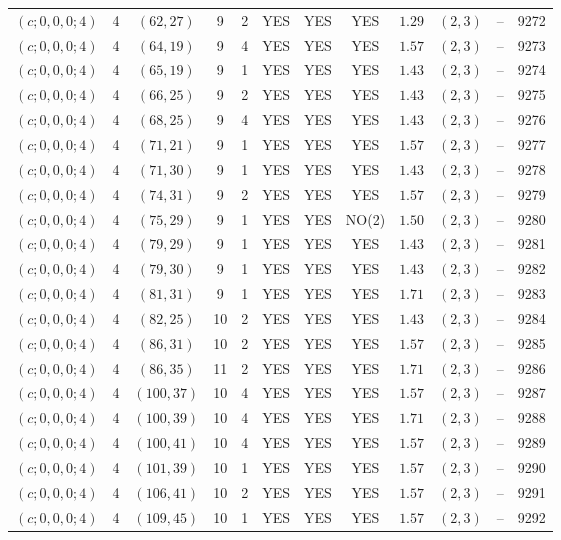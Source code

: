 \begin{longtable}{|c|c|c|c|c|c|c|c|c|c|c|c|}
$(c;0,0,0;4)$ & 4 & $(62,27)$ & 9 & 2 & YES & YES & YES & $1.29$ & $(2,3)$ & -- & 9272\\
$(c;0,0,0;4)$ & 4 & $(64,19)$ & 9 & 4 & YES & YES & YES & $1.57$ & $(2,3)$ & -- & 9273\\
$(c;0,0,0;4)$ & 4 & $(65,19)$ & 9 & 1 & YES & YES & YES & $1.43$ & $(2,3)$ & -- & 9274\\
$(c;0,0,0;4)$ & 4 & $(66,25)$ & 9 & 2 & YES & YES & YES & $1.43$ & $(2,3)$ & -- & 9275\\
$(c;0,0,0;4)$ & 4 & $(68,25)$ & 9 & 4 & YES & YES & YES & $1.43$ & $(2,3)$ & -- & 9276\\
$(c;0,0,0;4)$ & 4 & $(71,21)$ & 9 & 1 & YES & YES & YES & $1.57$ & $(2,3)$ & -- & 9277\\
$(c;0,0,0;4)$ & 4 & $(71,30)$ & 9 & 1 & YES & YES & YES & $1.43$ & $(2,3)$ & -- & 9278\\
$(c;0,0,0;4)$ & 4 & $(74,31)$ & 9 & 2 & YES & YES & YES & $1.57$ & $(2,3)$ & -- & 9279\\
$(c;0,0,0;4)$ & 4 & $(75,29)$ & 9 & 1 & YES & YES & NO(2) & $1.50$ & $(2,3)$ & -- & 9280\\
$(c;0,0,0;4)$ & 4 & $(79,29)$ & 9 & 1 & YES & YES & YES & $1.43$ & $(2,3)$ & -- & 9281\\
$(c;0,0,0;4)$ & 4 & $(79,30)$ & 9 & 1 & YES & YES & YES & $1.43$ & $(2,3)$ & -- & 9282\\
$(c;0,0,0;4)$ & 4 & $(81,31)$ & 9 & 1 & YES & YES & YES & $1.71$ & $(2,3)$ & -- & 9283\\
$(c;0,0,0;4)$ & 4 & $(82,25)$ & 10 & 2 & YES & YES & YES & $1.43$ & $(2,3)$ & -- & 9284\\
$(c;0,0,0;4)$ & 4 & $(86,31)$ & 10 & 2 & YES & YES & YES & $1.57$ & $(2,3)$ & -- & 9285\\
$(c;0,0,0;4)$ & 4 & $(86,35)$ & 11 & 2 & YES & YES & YES & $1.71$ & $(2,3)$ & -- & 9286\\
$(c;0,0,0;4)$ & 4 & $(100,37)$ & 10 & 4 & YES & YES & YES & $1.57$ & $(2,3)$ & -- & 9287\\
$(c;0,0,0;4)$ & 4 & $(100,39)$ & 10 & 4 & YES & YES & YES & $1.71$ & $(2,3)$ & -- & 9288\\
$(c;0,0,0;4)$ & 4 & $(100,41)$ & 10 & 4 & YES & YES & YES & $1.57$ & $(2,3)$ & -- & 9289\\
$(c;0,0,0;4)$ & 4 & $(101,39)$ & 10 & 1 & YES & YES & YES & $1.57$ & $(2,3)$ & -- & 9290\\
$(c;0,0,0;4)$ & 4 & $(106,41)$ & 10 & 2 & YES & YES & YES & $1.57$ & $(2,3)$ & -- & 9291\\
$(c;0,0,0;4)$ & 4 & $(109,45)$ & 10 & 1 & YES & YES & YES & $1.57$ & $(2,3)$ & -- & 9292\\

\end{longtable}
